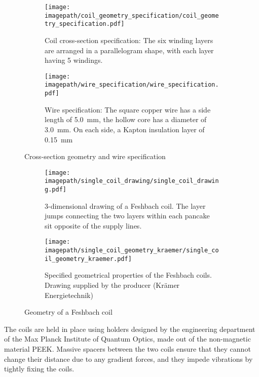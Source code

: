 \begin{figure}
    \centering
    \begin{subfigure}[t]{0.45\textwidth}
        \centering
        \texttt{[image: \\imagepath/coil\_geometry\_specification/coil\_geometry\_specification.pdf]}
        \caption{Coil cross-section specification: The six winding layers are arranged in a parallelogram shape, with each layer having 5 windings.}
        \label{fig:coil_geometry_specification}
    \end{subfigure}
    \hspace{0.09\textwidth}
    \begin{subfigure}[t]{0.45\textwidth}
        \centering
        \texttt{[image: \\imagepath/wire\_specification/wire\_specification.pdf]}
        \caption{Wire specification: The square copper wire has a side length of \SI{5.0}{\milli\meter}, the hollow core has a diameter of \SI{3.0}{\milli\meter}. On each side, a Kapton insulation layer of \SI{0.15}{\milli\meter} }
        \label{fig:wire_specification}
    \end{subfigure}
    \caption{Cross-section geometry and wire specification}
\end{figure}

\begin{figure}
    \centering
    \begin{subfigure}[t]{0.48\textwidth}
        \centering
        \texttt{[image: \\imagepath/single\_coil\_drawing/single\_coil\_drawing.pdf]}
        \caption{3-dimensional drawing of a Feshbach coil. The layer jumps connecting the two layers within each pancake sit opposite of the supply lines.} 
        \label{fig:single_coil_drawing}
    \end{subfigure}
    \hspace{0.03\textwidth}
    \begin{subfigure}[t]{0.48\textwidth}
        \centering
        \texttt{[image: \\imagepath/single\_coil\_geometry\_kraemer/single\_coil\_geometry\_kraemer.pdf]}
        \caption{Specified geometrical properties of the Feshbach coils. Drawing supplied by the producer (Krämer Energietechnik)}
        \label{fig:single_coil_geometry_kraemer}
    \end{subfigure}
    \caption{Geometry of a Feshbach coil}
\end{figure}

The coils are held in place using holders designed by the engineering department of the Max Planck Institute of Quantum Optics, made out of the non-magnetic material PEEK. Massive spacers between the two coils ensure that they cannot change their distance due to any gradient forces, and they impede vibrations by tightly fixing the coils.

